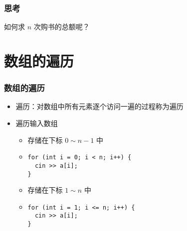 \begin{frame}[fragile]
    \frametitle{思考}

    \begin{block}{}
        \vspace{.5cm}
        \begin{center}
            如何求 $n$ 次购书的总额呢？
        \end{center}
        \vspace{.5cm}
    \end{block}
\end{frame}


\section{数组的遍历}

\begin{frame}[fragile]
    \frametitle{数组的遍历}

    \begin{overlayarea}{\textwidth}{.66\textheight}
        \begin{itemize}
            \item 遍历：对数组中所有元素逐个访问一遍的过程称为遍历

            \item 遍历输入数组

                \begin{itemize}
                    \item<1-> 存储在下标 $0 \sim n - 1$ 中
                    \item<1-> \lstinline|for (int i = 0; i < n; i++) {|\\
                        \lstinline|  cin >> a[i];|\\
                        \lstinline|}|
                    \item<2-> 存储在下标 $1 \sim n$ 中
                    \item<2-> \lstinline|for (int i = 1; i <= n; i++) {|\\
                        \lstinline|  cin >> a[i];|\\
                        \lstinline|}|
                \end{itemize}

        \end{itemize}
    \end{overlayarea}
\end{frame}

